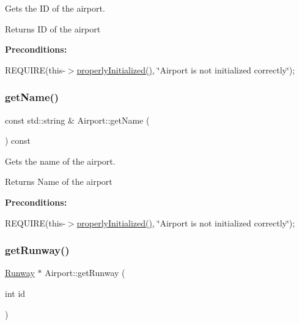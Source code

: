 Gets the ID of the airport. 

\begin{DoxyReturn}{Returns}
ID of the airport
\end{DoxyReturn}
{\bfseries Preconditions\+:}
\begin{DoxyItemize}
\item R\+E\+Q\+U\+I\+RE(this-\/$>$\mbox{\hyperlink{class_airport_aa13e68ac58e8875837fbe888325cfff6}{properly\+Initialized()}}, \char`\"{}\+Airport is not initialized correctly\char`\"{}); 
\end{DoxyItemize}\mbox{\label{class_airport_aa5be38443c1de176e52c4f5f5252c956}} 
\subsubsection{\texorpdfstring{get\+Name()}{getName()}}
{\footnotesize\ttfamily const std\+::string \& Airport\+::get\+Name (\begin{DoxyParamCaption}{ }\end{DoxyParamCaption}) const}



Gets the name of the airport. 

\begin{DoxyReturn}{Returns}
Name of the airport
\end{DoxyReturn}
{\bfseries Preconditions\+:}
\begin{DoxyItemize}
\item R\+E\+Q\+U\+I\+RE(this-\/$>$\mbox{\hyperlink{class_airport_aa13e68ac58e8875837fbe888325cfff6}{properly\+Initialized()}}, \char`\"{}\+Airport is not initialized correctly\char`\"{}); 
\end{DoxyItemize}\mbox{\label{class_airport_a1d7b9530df732ebee79ce0f1de7616e2}} 
\subsubsection{\texorpdfstring{get\+Runway()}{getRunway()}}
{\footnotesize\ttfamily \mbox{\hyperlink{class_runway}{Runway}} $\ast$ Airport\+::get\+Runway (\begin{DoxyParamCaption}\item[{int}]{id }\end{DoxyParamCaption})}



